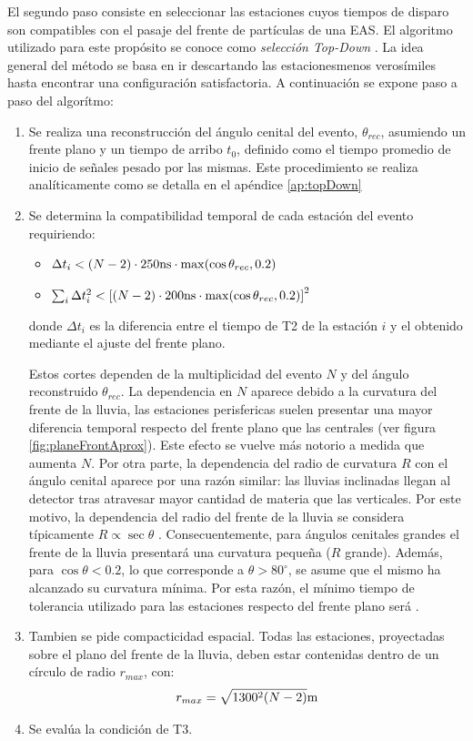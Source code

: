 	El segundo paso consiste en seleccionar las estaciones cuyos tiempos de disparo son compatibles con el pasaje del frente de part\'iculas de una EAS.
	El algoritmo utilizado para este propósito se conoce como \emph{selección Top-Down} \cite{topDownSel}.
	La idea general del método se basa en ir descartando las estacionesmenos veros\'imiles hasta encontrar una configuración satisfactoria.
	A continuación se expone paso a paso del algorítmo:
	\begin{enumerate}
	 \item Se realiza una reconstrucción del ángulo cenital del evento, $\theta_{rec}$, asumiendo un frente plano y un tiempo de arribo $t_0$, definido como el tiempo promedio de inicio de señales pesado por las mismas. Este procedimiento se realiza anal\'iticamente como se detalla en el apéndice \ref{ap:topDown}
	 \item Se determina la compatibilidad temporal de cada estación del evento requiriendo:
	 \begin{itemize}
	  \item $\Delta t_i < (N-2)\cdot 250{\rm ns} \cdot {\rm max}(\cos\theta_{rec},0.2)$
	  \item $\sum_i\Delta t_i^2 < \left[(N-2)\cdot 200{\rm ns} \cdot {\rm max}(\cos\theta_{rec},0.2)\right]^2$
	 \end{itemize}
	 donde $\Delta t_i$ es la diferencia entre el tiempo de T2 de la estaci\'on $i$ y el obtenido mediante el ajuste del frente plano.
	 
	 Estos cortes dependen de la multiplicidad del evento $N$ y del ángulo reconstruido $\theta_{rec}$.
	 La dependencia en $N$ aparece debido a la curvatura del frente de la lluvia, las estaciones perisfericas suelen presentar una mayor diferencia temporal respecto del frente plano que las centrales (ver figura \ref{fig:planeFrontAprox}).
	 Este efecto se vuelve m\'as notorio a medida que aumenta $N$.
	 Por otra parte, la dependencia del radio de curvatura $R$ con el ángulo cenital aparece por una razón similar: las lluvias inclinadas llegan al detector tras atravesar mayor cantidad de materia que las verticales. Por este motivo, la dependencia del radio del frente de la lluvia se considera típicamente $R\propto\sec\theta$ \cite{cite:ShowerFront}.
	 Consecuentemente, para ángulos cenitales grandes el frente de la lluvia presentar\'a una curvatura pequeña ($R$ grande).
	 Adem\'as, para $\cos\theta < 0.2$, lo que corresponde a $\theta>80^\circ$, se asume que el mismo ha alcanzado su curvatura mínima.
	 Por esta raz\'on, el mínimo tiempo de tolerancia utilizado para las estaciones respecto del frente plano será .
	 \item Tambien se pide compacticidad espacial.
	 Todas las estaciones, proyectadas sobre el plano del frente de la lluvia, deben estar contenidas dentro de un círculo de radio $r_{max}$, con:
	 \begin{equation}
	  r_{max} = \sqrt{1300^2(N-2)}{\rm m}
	 \end{equation}
	 \item Se eval\'ua la condición de T3.
	\end{enumerate}
